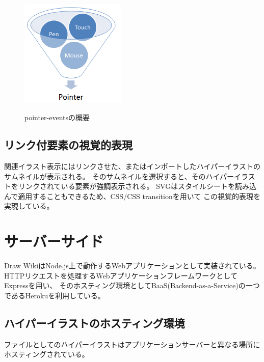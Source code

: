 \begin{figure}[htbp]
    \begin{center}
    {\includegraphics[width=50mm]{images/pevents.png}} \end{center}
    \caption{pointer-eventsの概要}
\end{figure}

\subsection{リンク付要素の視覚的表現}
関連イラスト表示にはリンクさせた、またはインポートしたハイパーイラストのサムネイルが表示される。
そのサムネイルを選択すると、そのハイパーイラストをリンクされている要素が強調表示される。
SVGはスタイルシートを読み込んで適用することもできるため、CSS/CSS transitionを用いて
この視覚的表現を実現している。


\section{サーバーサイド}
Draw WikiはNode.js上で動作するWebアプリケーションとして実装されている。
HTTPリクエストを処理するWebアプリケーションフレームワークとしてExpressを用い、
そのホスティング環境としてBaaS(Backend-as-a-Service)の一つであるHerokuを利用している。

\subsection{ハイパーイラストのホスティング環境}
ファイルとしてのハイパーイラストはアプリケーションサーバーと異なる場所にホスティングされている。

